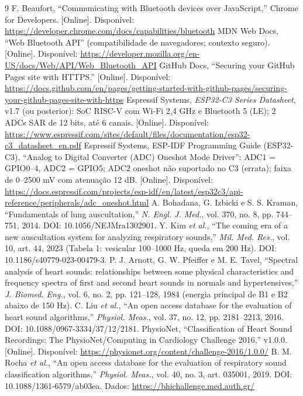 \documentclass[conference,a4paper]{IEEEtran}
\begin{document}
\begin{thebibliography}{9}\small
{} F. Beaufort, ``Communicating with Bluetooth devices over JavaScript,'' Chrome for Developers. [Online]. Disponível: \url{https://developer.chrome.com/docs/capabilities/bluetooth}
 MDN Web Docs, ``Web Bluetooth API'' (compatibilidade de navegadores; contexto seguro). [Online]. Disponível: \url{https://developer.mozilla.org/en-US/docs/Web/API/Web_Bluetooth_API}
 GitHub Docs, ``Securing your GitHub Pages site with HTTPS.'' [Online]. Disponível: \url{https://docs.github.com/en/pages/getting-started-with-github-pages/securing-your-github-pages-site-with-https}
 Espressif Systems, \emph{ESP32-C3 Series Datasheet}, v1.7 (ou posterior): SoC RISC-V com Wi-Fi 2,4 GHz e Bluetooth 5 (LE); 2 ADCs SAR de 12 bits, até 6 canais. [Online]. Disponível: \url{https://www.espressif.com/sites/default/files/documentation/esp32-c3_datasheet_en.pdf}
 Espressif Systems, ESP-IDF Programming Guide (ESP32-C3), ``Analog to Digital Converter (ADC) Oneshot Mode Driver'': ADC1 = GPIO0--4, ADC2 = GPIO5; ADC2 oneshot não suportado no C3 (errata); faixa de 0--2500 mV com atenuação 12 dB. [Online]. Disponível: \url{https://docs.espressif.com/projects/esp-idf/en/latest/esp32c3/api-reference/peripherals/adc_oneshot.html}
 A. Bohadana, G. Izbicki e S. S. Kraman, ``Fundamentals of lung auscultation,'' \emph{N. Engl. J. Med.}, vol. 370, no. 8, pp. 744--751, 2014. DOI: 10.1056/NEJMra1302901.
 Y. Kim \emph{et al.}, ``The coming era of a new auscultation system for analyzing respiratory sounds,'' \emph{Mil. Med. Res.}, vol. 10, art. 44, 2023 (Tabela 1: vesicular 100--1000 Hz, queda em 200 Hz). DOI: 10.1186/s40779-023-00479-3.
 P. J. Arnott, G. W. Pfeiffer e M. E. Tavel, ``Spectral analysis of heart sounds: relationships between some physical characteristics and frequency spectra of first and second heart sounds in normals and hypertensives,'' \emph{J. Biomed. Eng.}, vol. 6, no. 2, pp. 121--128, 1984 (energia principal de B1 e B2 abaixo de 150 Hz).
 C. Liu \emph{et al.}, ``An open access database for the evaluation of heart sound algorithms,'' \emph{Physiol. Meas.}, vol. 37, no. 12, pp. 2181--2213, 2016. DOI: 10.1088/0967-3334/37/12/2181.
 PhysioNet, ``Classification of Heart Sound Recordings: The PhysioNet/Computing in Cardiology Challenge 2016,'' v1.0.0. [Online]. Disponível: \url{https://physionet.org/content/challenge-2016/1.0.0/}
 B. M. Rocha \emph{et al.}, ``An open access database for the evaluation of respiratory sound classification algorithms,'' \emph{Physiol. Meas.}, vol. 40, no. 3, art. 035001, 2019. DOI: 10.1088/1361-6579/ab03ea. Dados: \url{https://bhichallenge.med.auth.gr/}
\end{thebibliography}
\end{document}
